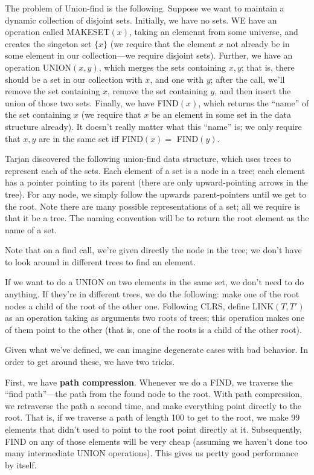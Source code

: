 \documentclass{article}
\begin{document}
The problem of Union-find is the following.
Suppose we want to maintain a dynamic collection of disjoint sets.
Initially, we have no sets.
WE have an operation called MAKESET$(x)$, taking an elemennt from some
universe, and creates the singeton set $\{x\}$ (we require that the element
$x$ not already be in some element in our collection---we require
disjoint sets).
Further, we have an operation UNION$(x,y)$, which merges the sets
containing $x,y$; that is, there should be a set in our collection with $x$,
and one with $y$; after the call, we'll remove the set containing $x$, remove
the set containing $y$, and then insert the union of those two sets.
Finally, we have FIND$(x)$, which returns the ``name'' of the set
containing $x$ (we require that $x$ be an element in some set in the data
structure already).
It doesn't really matter what this ``name'' is; we only require that
$x,y$ are in the same set iff FIND$(x) =$ FIND$(y)$.


Tarjan discovered the following union-find data structure, which uses
trees to represent each of the sets.
Each element of a set is a node in a tree; each element has a pointer
pointing to its parent (there are only upward-pointing arrows in the tree).
For any node, we simply follow the upwards parent-pointers until we get
to the root.
Note there are many possible representations of a set; all we require
is that it be a tree.
The naming convention will be to return the root element as the name
of a set.

Note that on a find call, we're given directly the node in the tree;
we don't have to look around in different trees to find an element.

If we want to do a UNION on two elements in the same set, we don't need
to do anything. If they're in different trees, we do the following:
make one of the root nodes a child of the root of the other one.
Following CLRS, define LINK$(T,T')$ as an operation taking as arguments two
roots of trees; this operation makes one of them point to the other (that is,
one of the roots is a child of the other root).

Given what we've defined, we can imagine degenerate cases with bad behavior.
In order to get around these, we have two tricks.


First, we have \textbf{path compression}.
Whenever we do a FIND, we traverse the ``find path''---the path from the
found node to the root.
With path compression, we retraverse the path a second time, and make
everything point directly to the root.
That is, if we traverse a path of length 100 to get to the root, we make
99 elements that didn't used to point to the root point directly at it.
Subsequently, FIND on any of those elements will be very cheap (assuming
we haven't done too many intermediate UNION operations).
This gives us pertty good performance by itself.
\end{document}
